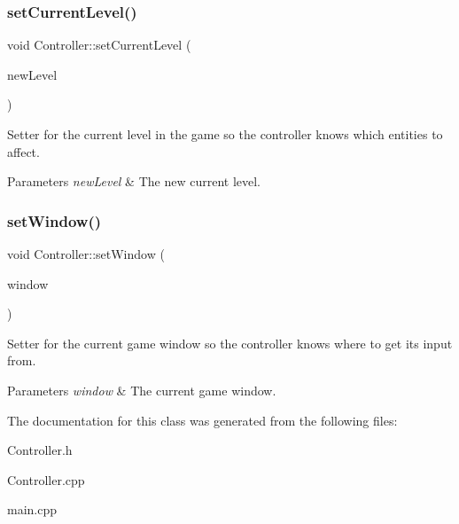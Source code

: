 \subsubsection{\texorpdfstring{set\+Current\+Level()}{setCurrentLevel()}}
{\footnotesize\ttfamily void Controller\+::set\+Current\+Level (\begin{DoxyParamCaption}\item[{shared\+\_\+ptr$<$ \hyperlink{classGameSFML_1_1Level}{Game\+S\+F\+M\+L\+::\+Level} $>$}]{new\+Level }\end{DoxyParamCaption})}

Setter for the current level in the game so the controller knows which entities to affect. 
\begin{DoxyParams}{Parameters}
{\em new\+Level} & The new current level. \\
\hline
\end{DoxyParams}
\mbox{\label{classController_a6ecc2df639760a276d0b9bf2f05ad3ab}} 
\subsubsection{\texorpdfstring{set\+Window()}{setWindow()}}
{\footnotesize\ttfamily void Controller\+::set\+Window (\begin{DoxyParamCaption}\item[{shared\+\_\+ptr$<$ sf\+::\+Render\+Window $>$}]{window }\end{DoxyParamCaption})}

Setter for the current game window so the controller knows where to get it\textquotesingle{}s input from. 
\begin{DoxyParams}{Parameters}
{\em window} & The current game window. \\
\hline
\end{DoxyParams}


The documentation for this class was generated from the following files\+:\begin{DoxyCompactItemize}
\item 
Controller.\+h\item 
Controller.\+cpp\item 
main.\+cpp\end{DoxyCompactItemize}
